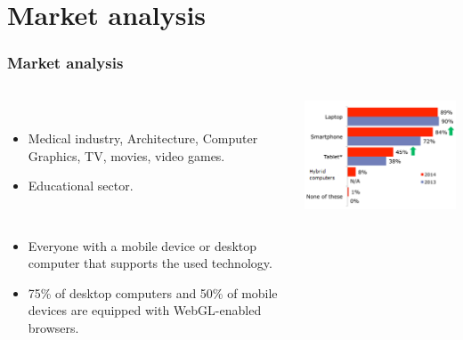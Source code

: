\section{Market analysis}

\begin{frame}
  \frametitle{Market analysis}
 \begin{columns}
    \begin{column}{0.6\textwidth}
      \begin{description}[]
        \item[Industrial Diversity] \hfill \\
        \begin{itemize}
          \item Medical industry, Architecture, Computer Graphics, TV, movies, video games.
          \item Educational sector.
        \end{itemize}

        \item[Wide User base] \hfill \\
          \begin{itemize}
            \item Everyone with a mobile device or desktop computer that supports the used technology.
            \item 75\% of desktop computers and 50\% of mobile devices are equipped with WebGL-enabled browsers.
        \end{itemize}
      \end{description}
    \end{column}

    \begin{column}{0.5\textwidth}
      \includegraphics[width=.9\textwidth]{images/devices.png}\\
    \end{column}
  \end{columns}
\end{frame}

